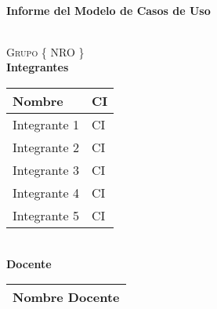 \documentclass[10pt,spanish]{article}
\newcommand{\Titulo}{Informe del Modelo de Casos de Uso}
\newcommand{\Grupo}{Grupo \{ NRO \}}
\newcommand{\NomIntegrUno}{Integrante 1}
\newcommand{\CiIntegrUno}{CI}
\newcommand{\NomIntegrDos}{Integrante 2}
\newcommand{\CiIntegrDos}{CI}
\newcommand{\NomIntegrTres}{Integrante 3}
\newcommand{\CiIntegrTres}{CI}
\newcommand{\NomIntegrCuatro}{Integrante 4}
\newcommand{\CiIntegrCuatro}{CI}
\newcommand{\NomIntegrCinco}{Integrante 5}
\newcommand{\CiIntegrCinco}{CI}
\newcommand{\NomDocente}{Nombre Docente}
\numberwithin{figure}{section} %
\begin{document}
\begin{center}
\vspace*{1cm}																		%
\HRule \\[0.4cm]																	%
{ \huge \bfseries \Titulo}\\[0.3cm]	%
\HRule \\[4cm]																	%
\begin{minipage}{0.8\textwidth}													%
\begin{flushleft} \large															%
\textsc{\LARGE \Grupo}\\
\LARGE{\textbf{Integrantes}}\\	
\Large
\vspace{0.3cm}
  \begin{tabular}{ | p{10cm} | p{2.5cm} | }
    \hline
    \textbf{Nombre} & \textbf{CI} \\ \hline
    \NomIntegrUno & \CiIntegrUno \\ \hline
    \NomIntegrDos & \CiIntegrDos  \\ \hline 
    \NomIntegrTres & \CiIntegrTres \\ \hline
    \NomIntegrCuatro & \CiIntegrCuatro \\ \hline
    \NomIntegrCinco & \CiIntegrCinco \\ \hline
  \end{tabular}\\[0.5cm]
\LARGE{\textbf{Docente}}\\	
\Large
\vspace{0.3cm}
\begin{tabular}{ | p{10cm} |}
    \hline
     \NomDocente \\ 
     \hline
  \end{tabular}
\end{flushleft}																		%
\end{minipage}		
\begin{minipage}{0.52\textwidth}		
\vspace{-0.6cm}											%
\begin{flushright} \large															%
\emph{} \\																	%
\end{flushright}																	%
\end{minipage}	
\begin{flushleft}
 	
\end{flushleft}
 		\flushleft{\textbf{}	}\\																		%
\end{center}							 											
																					
\end{document}
